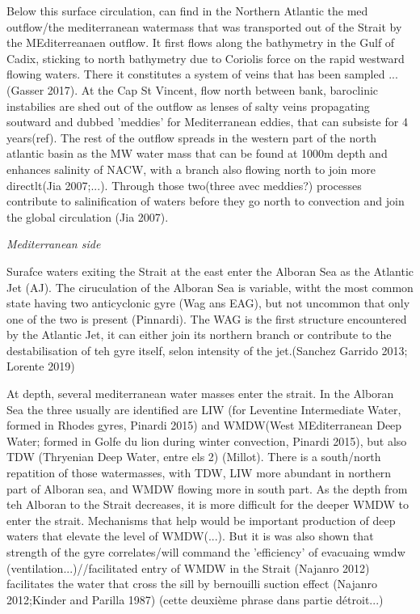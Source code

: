 Below this surface circulation, can find in the Northern Atlantic the med outflow/the mediterranean watermass that was transported out of the Strait by the MEditerreanaen outflow. It first flows along the bathymetry in the Gulf of Cadix, sticking to north bathymetry due to Coriolis force on the rapid westward flowing waters. There it constitutes a system of veins that has been sampled ... (Gasser 2017). At the Cap St Vincent, flow north between bank,  baroclinic instabilies are shed out of the outflow as lenses of salty veins propagating soutward and dubbed 'meddies' for Mediterranean eddies, that can subsiste for 4 years(ref). The rest of the outflow spreads in the western part of the north atlantic basin as the MW water mass that can be found at 1000m depth and enhances salinity of NACW, with a branch also flowing north to join more directlt(Jia 2007;...). Through those two(three avec meddies?) processes contribute to salinification of waters before they go north to convection and join the global circulation (Jia 2007).

\textit{Mediterranean side}


Surafce waters exiting the Strait at the east enter the Alboran Sea as the Atlantic Jet (AJ). The ciruculation of the Alboran Sea is variable, witht the most common state having two anticyclonic gyre (Wag ans EAG), but not uncommon that only one of the two is present (Pinnardi). The WAG is the first structure encountered by the Atlantic Jet, it can either join its northern branch or contribute to the destabilisation of teh gyre itself, selon intensity of the jet.(Sanchez Garrido 2013; Lorente 2019) 

At depth, several mediterranean water masses enter the strait. In the Alboran Sea the three usually are identified are LIW (for Leventine Intermediate Water, formed in Rhodes gyres, Pinardi 2015) and WMDW(West MEditerranean Deep Water; formed in Golfe du lion during winter convection, Pinardi 2015), but also TDW (Thryenian Deep Water, entre els 2) (Millot). There is a south/north repatition of those watermasses, with TDW, LIW more abundant in northern part of Alboran sea, and WMDW flowing more in south part. As the depth from teh Alboran to the Strait decreases, it is more difficult for the deeper WMDW to enter the strait. Mechanisms that help would be important production of deep waters that elevate the level of WMDW(...). But it is was also shown that strength of the gyre correlates/will command the 'efficiency' of evacuaing wmdw (ventilation...)//facilitated entry of WMDW in the Strait (Najanro 2012) facilitates the water that cross the sill by bernouilli suction effect (Najanro 2012;Kinder and Parilla 1987) (cette deuxième phrase dans partie détroit...) 


